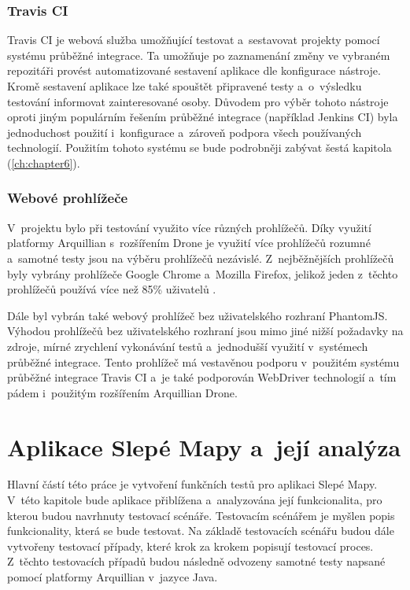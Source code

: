 \documentclass[
    color,   %
	table,   %
    twoside, %
    nolot, nolof,
]{fithesis3}
\begin{document}
\subsection{Travis CI}
Travis CI je webová služba umožňující testovat a~sestavovat projekty pomocí systému průběžné integrace. Ta umožňuje po zaznamenání změny ve vybraném repozitáři provést automatizované sestavení aplikace dle konfigurace nástroje. Kromě sestavení aplikace lze také spouštět připravené testy a~o~výsledku testování informovat zainteresované osoby. Důvodem pro výběr tohoto nástroje oproti jiným populárním řešením průběžné integrace (například Jenkins CI) byla jednoduchost použití i~konfigurace a~zároveň podpora všech používaných technologií. Použitím tohoto systému se bude podrobněji zabývat šestá kapitola (\ref{ch:chapter6}).
\subsection{Webové prohlížeče}
V~projektu bylo při testování využito více různých prohlížečů. Díky využití platformy Arquillian s~rozšířením Drone je využití více prohlížečů rozumné a~samotné testy jsou na výběru prohlížečů nezávislé. Z~nejběžnějších prohlížečů byly vybrány prohlížeče Google Chrome a~Mozilla Firefox, jelikož jeden z~těchto prohlížečů používá více než 85\% uživatelů \cite{Browsers}.

Dále byl vybrán také webový prohlížeč bez uživatelského rozhraní PhantomJS. Výhodou prohlížečů bez uživatelského rozhraní jsou mimo jiné nižší požadavky na zdroje, mírné zrychlení vykonávání testů a~jednodušší využití v~systémech průběžné integrace. Tento prohlížeč má vestavěnou podporu v~použitém systému průběžné integrace Travis CI a~je také podporován WebDriver technologií a~tím pádem i~použitým rozšířením Arquillian Drone.

\chapter{Aplikace Slepé Mapy a~její analýza}
\label{ch:chapter4}
Hlavní částí této práce je vytvoření funkčních testů pro aplikaci Slepé Mapy. V~této kapitole bude aplikace přiblížena a~analyzována její funkcionalita, pro kterou  budou navrhnuty testovací scénáře. Testovacím scénářem je myšlen popis funkcionality, která se bude testovat. Na základě testovacích scénářu budou dále vytvořeny testovací případy, které krok za krokem popisují testovací proces. Z~těchto testovacích případů budou následně odvozeny samotné testy napsané pomocí platformy Arquillian v~jazyce Java.
\end{document}
